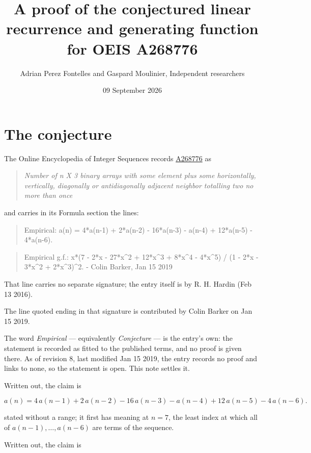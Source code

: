 \documentclass[11pt]{article}
\title{A proof of the conjectured linear recurrence and generating function for OEIS A268776}
\author{Adrian Perez Fontelles and Gaspard Moulinier, Independent researchers}
\date{09 September 2026}
\theoremstyle{definition}
\begin{document}
\maketitle
\section{The conjecture}

The Online Encyclopedia of Integer Sequences records \href{https://oeis.org/A268776}{A268776} as

\begin{quote}\itshape Number of n X 3 binary arrays with some element plus some horizontally, vertically, diagonally or antidiagonally adjacent neighbor totalling two no more than once\end{quote}

and carries in its Formula section the lines:

\begin{quote}\ttfamily Empirical: a(n) = 4*a(n-1) + 2*a(n-2) - 16*a(n-3) - a(n-4) + 12*a(n-5) - 4*a(n-6).\end{quote}

\begin{quote}\ttfamily Empirical g.f.: x*(7 - 2*x - 27*x\textasciicircum{}2 + 12*x\textasciicircum{}3 + 8*x\textasciicircum{}4 - 4*x\textasciicircum{}5) / (1 - 2*x - 3*x\textasciicircum{}2 + 2*x\textasciicircum{}3)\textasciicircum{}2. -  Colin Barker, Jan 15 2019\end{quote}

That line carries no separate signature; the entry itself is by R. H. Hardin (Feb 13 2016).

The line quoted ending in that signature is contributed by Colin Barker on Jan 15 2019.

The word {\itshape Empirical} --- equivalently {\itshape Conjecture} --- is the entry's own: the statement is recorded as fitted to the published terms, and no proof is given there. As of revision 8, last modified Jan 15 2019, the entry records no proof and links to none, so the statement is open. This note settles it.

Written out, the claim is

\[a(n) = 4\,a(n-1) + 2\,a(n-2) - 16\,a(n-3) - a(n-4) + 12\,a(n-5) - 4\,a(n-6).\]

stated without a range; it first has meaning at $n = 7$, the least index at which all of $a(n-1),\dots,a(n-6)$ are terms of the sequence.

Written out, the claim is
\end{document}
